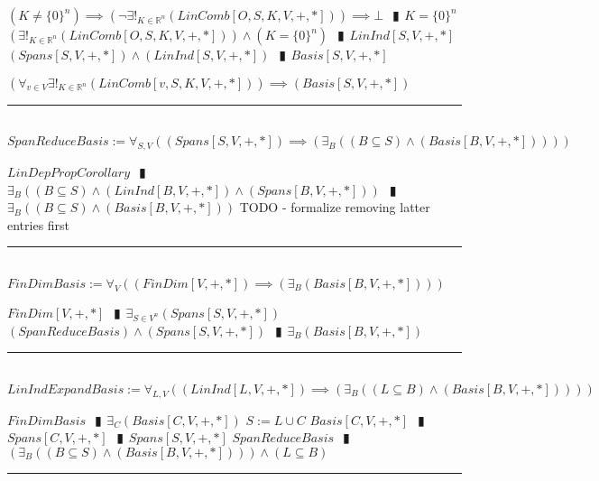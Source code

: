 \documentclass{book}
\newcommand{\abr}{:=}
\newcommand{\pipe}{$\phantom{(}\vrectangleblack\phantom{)}$}
\newcommand{\pr}[1]{\left(#1\right)}
\begin{document}
\begin{enumerate}
\begin{enumerate}
    \lit $(K \neq \{0\}^n) \implies \pr{\lnot \exists!_{K \in \mathbb{R}^n}(LinComb[O, S, K, V, +, *])} \implies \bot$ \pipe $K = \{0\}^n$
    \lit $\pr{\exists!_{K \in \mathbb{R}^n}(LinComb[O, S, K, V, +, *])} \land (K = \{0\}^n)$ \pipe $LinInd[S, V, +, *]$
    \lit $(Spans[S, V, +, *]) \land (LinInd[S, V, +, *])$ \pipe $Basis[S, V, +, *]$
  \end{enumerate}
  \lit $\pr{\forall_{v \in V} \exists!_{K \in \mathbb{R}^n}(LinComb[v, S, K, V, +, *])} \implies (Basis[S, V, +, *])$
\end{enumerate} \vspace{.75mm} \hrule \vspace{.75mm} \ \\ 

$SpanReduceBasis \abr \forall_{S, V}\pr{(Spans[S, V, +, *]) \implies \pr{\exists_{B}\pr{(B \subseteq S) \land (Basis[B, V, +, *])}}}$
\begin{enumerate}
  \lit $LinDepPropCorollary$ \pipe $\exists_{B}\pr{(B \subseteq S) \land (LinInd[B, V, +, *]) \land (Spans[B, V, +, *])}$ \pipe $\exists_{B}\pr{(B \subseteq S) \land (Basis[B, V, +, *])}$
  \lit TODO - formalize removing latter entries first 
\end{enumerate} \vspace{.75mm} \hrule \vspace{.75mm} \ \\ 

$FinDimBasis \abr \forall_{V}\pr{(FinDim[V, +, *]) \implies \pr{\exists_{B}(Basis[B, V, +, *])}}$
\begin{enumerate}
  \lit $FinDim[V, +, *]$ \pipe $\exists_{S \in V^n}(Spans[S, V, +, *])$
  \lit $(SpanReduceBasis) \land (Spans[S, V, +, *])$ \pipe $\exists_{B}(Basis[B, V, +, *])$
\end{enumerate} \vspace{.75mm} \hrule \vspace{.75mm} \ \\ 

$LinIndExpandBasis \abr \forall_{L, V}\pr{(LinInd[L, V, +, *]) \implies \pr{\exists_{B}\pr{(L \subseteq B) \land (Basis[B, V, +, *])}}}$
\begin{enumerate}
  \lit $FinDimBasis$ \pipe $\exists_{C}(Basis[C, V, +, *])$
  \lit $S \abr L \cup C$
  \lit $Basis[C, V, +, *]$ \pipe $Spans[C, V, +, *]$ \pipe $Spans[S, V, +, *]$
  \lit $SpanReduceBasis$ \pipe $\pr{\exists_{B}\pr{(B \subseteq S) \land (Basis[B, V, +, *])}} \land (L \subseteq B)$ 
\end{enumerate} \vspace{.75mm} \hrule \vspace{.75mm} \ \\ 
\end{document}
